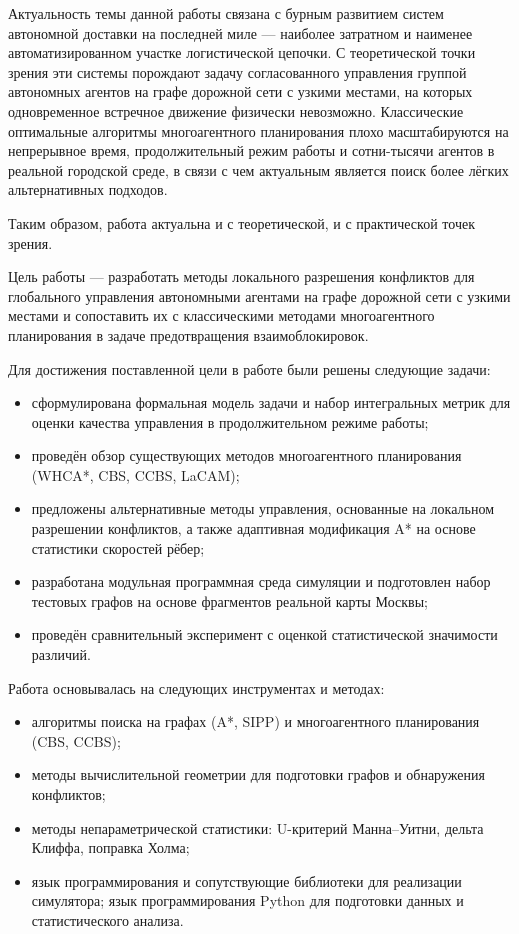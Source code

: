 \introduction

Актуальность темы данной работы связана с бурным развитием систем автономной
доставки на последней миле --- наиболее затратном и наименее автоматизированном
участке логистической цепочки. С теоретической точки зрения эти системы 
порождают задачу согласованного управления группой автономных агентов
на графе дорожной сети с узкими местами, на которых одновременное встречное
движение физически невозможно. Классические оптимальные алгоритмы многоагентного
планирования плохо масштабируются на непрерывное время, продолжительный режим
работы и сотни-тысячи агентов в реальной городской среде, в связи с чем
актуальным является поиск более лёгких альтернативных подходов.

Таким образом, работа актуальна и с теоретической, и с практической
точек зрения.

Цель работы --- разработать методы локального разрешения
конфликтов для глобального управления автономными агентами 
на графе дорожной сети с узкими местами и сопоставить их с классическими
методами многоагентного планирования в задаче предотвращения взаимоблокировок.

Для достижения поставленной цели в работе были решены следующие задачи:
\begin{itemize}
  \item сформулирована формальная модель задачи и набор интегральных метрик
        для оценки качества управления в продолжительном режиме работы;
  \item проведён обзор существующих методов многоагентного планирования
        (WHCA*, CBS, CCBS, LaCAM);
  \item предложены альтернативные методы управления, основанные на локальном
        разрешении конфликтов, а также
        адаптивная модификация A* на основе статистики скоростей рёбер;
  \item разработана модульная программная среда симуляции и подготовлен набор
        тестовых графов на основе фрагментов реальной карты Москвы;
  \item проведён сравнительный эксперимент с оценкой статистической значимости
        различий.
\end{itemize}

Работа основывалась на следующих инструментах и методах:
\begin{itemize}
  \item алгоритмы поиска на графах (A*, SIPP) и многоагентного планирования
        (CBS, CCBS);
  \item методы вычислительной геометрии для подготовки графов и обнаружения
        конфликтов;
  \item методы непараметрической статистики: U-критерий Манна--Уитни, дельта
        Клиффа, поправка Холма;
  \item язык программирования \CC{} и сопутствующие библиотеки для реализации симулятора;
        язык программирования Python для подготовки данных и статистического анализа.
\end{itemize}

